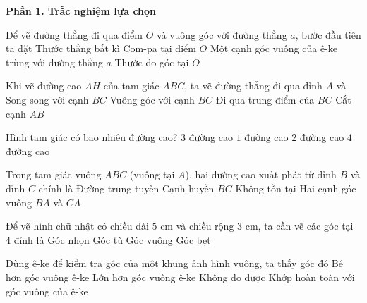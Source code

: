 \textbf{Phần 1. Trắc nghiệm lựa chọn}

\begin{ex} %
Để vẽ đường thẳng đi qua điểm $O$ và vuông góc với đường thẳng $a$, bước đầu tiên ta đặt
\choice
{Thước thẳng bất kì}
{Com-pa tại điểm $O$}
{\True Một cạnh góc vuông của ê-ke trùng với đường thẳng $a$}
{Thước đo góc tại $O$}
\end{ex}

\begin{ex} %
Khi vẽ đường cao $AH$ của tam giác $ABC$, ta vẽ đường thẳng đi qua đỉnh $A$ và
\choice
{Song song với cạnh $BC$}
{\True Vuông góc với cạnh $BC$}
{Đi qua trung điểm của $BC$}
{Cắt cạnh $AB$}
\end{ex}

\begin{ex} %
Hình tam giác có bao nhiêu đường cao?
\choice
{\True $3$ đường cao}
{$1$ đường cao}
{$2$ đường cao}
{$4$ đường cao}
\end{ex}

\begin{ex} %
Trong tam giác vuông $ABC$ (vuông tại $A$), hai đường cao xuất phát từ đỉnh $B$ và đỉnh $C$ chính là
\choice
{Đường trung tuyến}
{Cạnh huyền $BC$}
{Không tồn tại}
{\True Hai cạnh góc vuông $BA$ và $CA$}
\end{ex}

\begin{ex} %
Để vẽ hình chữ nhật có chiều dài $5\text{ cm}$ và chiều rộng $3\text{ cm}$, ta cần vẽ các góc tại 4 đỉnh là
\choice
{Góc nhọn}
{Góc tù}
{\True Góc vuông}
{Góc bẹt}
\end{ex}

\begin{ex} %
Dùng ê-ke để kiểm tra góc của một khung ảnh hình vuông, ta thấy góc đó
\choice
{Bé hơn góc vuông ê-ke}
{Lớn hơn góc vuông ê-ke}
{Không đo được}
{\True Khớp hoàn toàn với góc vuông của ê-ke}
\end{ex}

